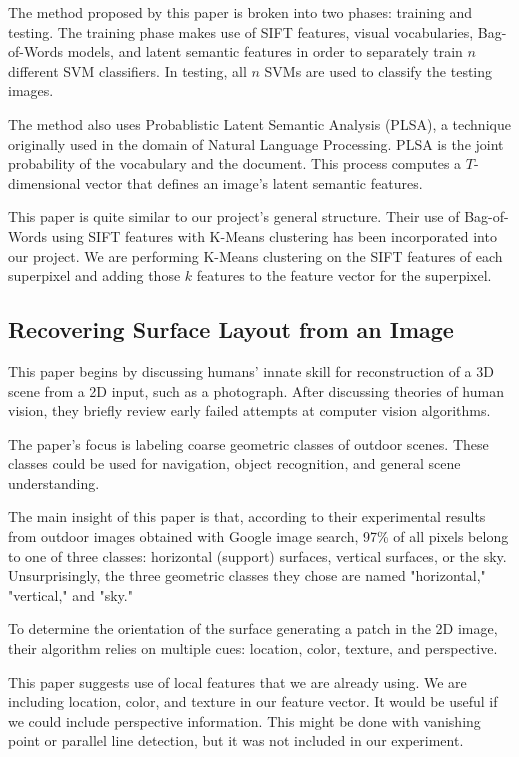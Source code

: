 \documentclass[10pt,twocolumn,letterpaper]{article}
\begin{document}
The method proposed by this paper is broken into two phases: training and testing. The training phase makes use of SIFT features, visual vocabularies, Bag-of-Words models, and latent semantic features in order to separately train $n$ different SVM classifiers.  In testing, all $n$ SVMs are used to classify the testing images.

The method also uses Probablistic Latent Semantic Analysis (PLSA), a technique originally used in the domain of Natural Language Processing.  PLSA is the joint probability of the vocabulary and the document.  This process computes a $T$-dimensional vector that defines an image's latent semantic features.

This paper is quite similar to our project's general structure.  Their use of Bag-of-Words using SIFT features with K-Means clustering has been incorporated into our project.  We are performing K-Means clustering on the SIFT features of each superpixel and adding those $k$ features to the feature vector for the superpixel.


\subsection{Recovering Surface Layout from an Image \cite{hoiem}}

This paper begins by discussing humans' innate skill for reconstruction of a 3D scene from a 2D input, such as a photograph.  After discussing theories of human vision, they briefly review early failed attempts at computer vision algorithms.

The paper's focus is labeling coarse geometric classes of outdoor scenes. These classes could be used for navigation, object recognition, and general scene understanding.

The main insight of this paper is that, according to their experimental results from outdoor images obtained with Google image search, 97\% of all pixels belong to one of three classes: horizontal (support) surfaces, vertical surfaces, or the sky.   Unsurprisingly, the three geometric classes they chose are named "horizontal," "vertical," and "sky."

To determine the orientation of the surface generating a patch in the 2D image, their algorithm relies on multiple cues: location, color, texture, and perspective.

This paper suggests use of local features that we are already using.  We are including location, color, and texture in our feature vector. It would be useful if we could include perspective information. This might be done with vanishing point or parallel line detection, but it was not included in our experiment.
\end{document}
